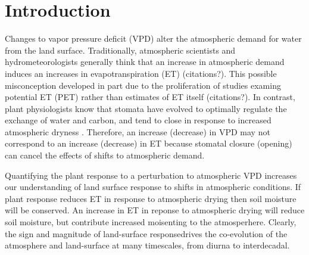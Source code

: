 \documentclass[draft,linenumbers]{agujournal}
\begin{document}

%
% 
% 
% 


\section{Introduction}


Changes to vapor pressure deficit (VPD) alter the atmospheric demand for water from the land surface. Traditionally, atmospheric scientists and hydrometeorologists generally think that an increase in atmospheric demand induces an increases in evapotranspiration (ET) (citations?). This possible misconception developed in part due to the proliferation of studies examing potential ET (PET) rather than estimates of ET itself (citations?).  In contrast, plant physiologists know that stomata have evolved to optimally regulate the exchange of water and carbon, and tend to close in response to increased atmospheric dryness \citep{Ball_1987, Leuning_1990, MEDLYN_2011}.  Therefore, an increase (decrease) in VPD may not correspond to an increase (decrease) in ET because stomatal closure (opening) can cancel the effects of shifts to atmospheric demand.

Quantifying the plant response to a perturbation to atmospheric VPD increases our understanding of land surface response to shifts in atmospheric conditions. If plant response reduces ET in response to atmospheric drying then soil moisture will be conserved. An increase in ET in reponse to atmospheric drying will reduce soil moisture, but contribute increased moisenting to the atmosperhere. Clearly, the sign and magnitude of land-surface responsedrives the co-evolution of the atmosphere and land-surface at many timescales, from diurna to interdecadal.
\end{document}
